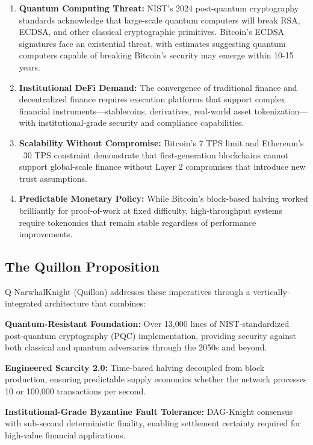 \documentclass[11pt,a4paper]{article}
\begin{document}
\begin{enumerate}[leftmargin=*]
\item \textbf{Quantum Computing Threat:} NIST's 2024 post-quantum cryptography standards acknowledge that large-scale quantum computers will break RSA, ECDSA, and other classical cryptographic primitives. Bitcoin's ECDSA signatures face an existential threat, with estimates suggesting quantum computers capable of breaking Bitcoin's security may emerge within 10-15 years.

\item \textbf{Institutional DeFi Demand:} The convergence of traditional finance and decentralized finance requires execution platforms that support complex financial instruments—stablecoins, derivatives, real-world asset tokenization—with institutional-grade security and compliance capabilities.

\item \textbf{Scalability Without Compromise:} Bitcoin's 7 TPS limit and Ethereum's ~30 TPS constraint demonstrate that first-generation blockchains cannot support global-scale finance without Layer 2 compromises that introduce new trust assumptions.

\item \textbf{Predictable Monetary Policy:} While Bitcoin's block-based halving worked brilliantly for proof-of-work at fixed difficulty, high-throughput systems require tokenomics that remain stable regardless of performance improvements.
\end{enumerate}

\subsection{The Quillon Proposition}

Q-NarwhalKnight (Quillon) addresses these imperatives through a vertically-integrated architecture that combines:

\textbf{Quantum-Resistant Foundation:} Over 13,000 lines of NIST-standardized post-quantum cryptography (PQC) implementation, providing security against both classical and quantum adversaries through the 2050s and beyond.

\textbf{Engineered Scarcity 2.0:} Time-based halving decoupled from block production, ensuring predictable supply economics whether the network processes 10 or 100,000 transactions per second.

\textbf{Institutional-Grade Byzantine Fault Tolerance:} DAG-Knight consensus with sub-second deterministic finality, enabling settlement certainty required for high-value financial applications.
\end{document}
